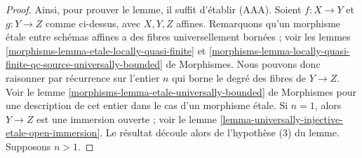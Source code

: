 \begin{proof}
\medskip\noindent
Ainsi, pour prouver le lemme, il suffit d'établir (AAA).
Soient $f : X \to Y$ et $g : Y \to Z$ comme ci-dessus, avec $X, Y, Z$
affines. Remarquons qu'un morphisme \'etale entre schémas affines a des fibres
universellement bornées ; voir les lemmes
\ref{morphisms-lemma-etale-locally-quasi-finite} et
\ref{morphisms-lemma-locally-quasi-finite-qc-source-universally-bounded} de
Morphismes.
Nous pouvons donc raisonner par récurrence sur l'entier $n$ qui borne le degré
des fibres de $Y \to Z$. Voir le
lemme \ref{morphisms-lemma-etale-universally-bounded} de Morphismes pour une description de
cet entier dans le cas d'un morphisme \'etale.
Si $n = 1$, alors $Y \to Z$ est une immersion ouverte ; voir le
lemme \ref{lemma-universally-injective-etale-open-immersion}. Le résultat
découle alors de l'hypothèse (3) du lemme. Supposons $n > 1$.


\end{proof}
